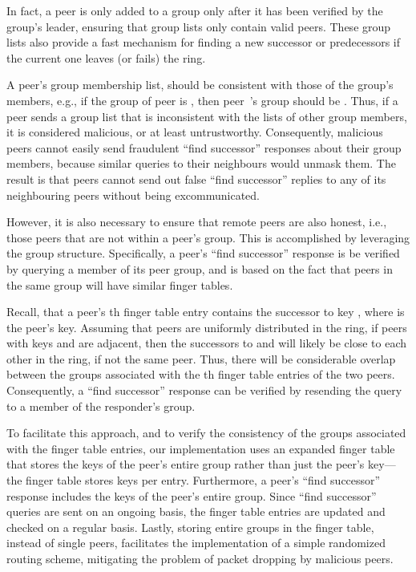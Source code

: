 \documentclass[11pt]{article}
\begin{document}
In fact, a peer is only added to a group only after it has been 
verified by the group's leader, ensuring that group lists only 
contain valid peers.  These group lists also provide a fast 
mechanism for finding a new successor or predecessors if the 
current one leaves (or fails) the ring.

A peer's group membership list, should be consistent with those of
the group's members, e.g., if the group of peer  is ,
then peer~'s group should be .  Thus, if a peer
sends a group list that is inconsistent with the lists of other
group members, it is considered malicious, or at least untrustworthy.
Consequently, malicious peers cannot easily send fraudulent ``find
successor'' responses about their group members, because similar
queries to their neighbours would unmask them.  The result is that
peers cannot send out false ``find successor'' replies to any of
its neighbouring peers without being excommunicated.

However, it is also necessary to ensure that remote peers are also
honest, i.e., those peers that are not within a peer's group.  This
is accomplished by leveraging the group structure.  Specifically,
a peer's ``find successor'' response is be verified by querying a
member of its peer group, and is based on the fact that peers in the 
same group will have similar finger tables.  

Recall, that a peer's th finger table entry contains the successor
to key , where  is the peer's key.  Assuming
that peers are uniformly distributed in the ring, if peers with
keys  and  are adjacent, then the successors to  and  will likely be close
to each other in the ring, if not the same peer.  Thus, there will
be considerable overlap between the groups associated with the th
finger table entries of the two peers.  Consequently, a ``find
successor'' response can be verified by resending the query to a
member of the responder's group.

To facilitate this approach, and to verify the consistency of the
groups associated with the finger table entries, our implementation
uses an expanded finger table that stores the keys of the peer's
entire group rather than just the peer's key---the finger table
stores  keys per entry.  Furthermore, a peer's ``find successor''
response includes the keys of the peer's entire group.  Since ``find
successor'' queries are sent on an ongoing basis, the finger table
entries are updated and checked on a regular basis.  Lastly, storing
entire groups in the finger table, instead of single peers, facilitates
the implementation of a simple randomized routing scheme, mitigating
the problem of packet dropping by malicious peers.
\end{document}
